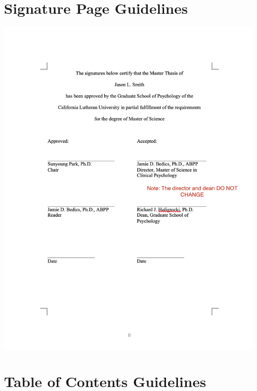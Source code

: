 \documentclass[openany]{book}
\begin{document}
\hypertarget{signature-page-guidelines}{%
\section{Signature Page Guidelines}\label{signature-page-guidelines}}

\includegraphics[width=13.94in]{images/signaturepage}

\hypertarget{table-of-contents-guidelines}{%
\section{Table of Contents Guidelines}\label{table-of-contents-guidelines}}
\end{document}
